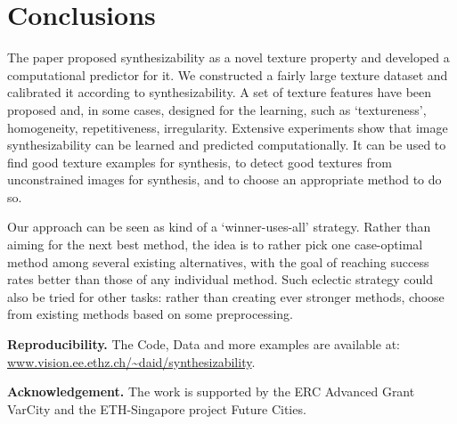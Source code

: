\documentclass[10pt,twocolumn,letterpaper]{article}
\begin{document}
\section{Conclusions}
\label{sec:conclusion}
The paper proposed synthesizability as a novel texture property and
developed a computational predictor for it. We constructed a fairly
large texture dataset and calibrated it according to
synthesizability. A set of texture features have been proposed and, in
some cases, designed for the learning, such as `textureness',
homogeneity, repetitiveness, irregularity. Extensive experiments show
that image synthesizability can be learned and predicted
computationally. It can be used to find good texture examples for
synthesis, to detect good textures from unconstrained images for
synthesis, and to choose an appropriate method to do so.

Our approach can be seen as kind of a `winner-uses-all' strategy. 
Rather than aiming for the next best method, the idea is to rather 
pick one case-optimal method among several existing alternatives,
with the goal of reaching success rates better than those of any 
individual method. Such eclectic strategy could also be tried for 
other tasks: rather than creating ever stronger methods, choose 
from existing methods based on some preprocessing. 

\noindent
\textbf{Reproducibility.} The Code, Data and more examples are
available at: \url{www.vision.ee.ethz.ch/~daid/synthesizability}.

\vspace{1mm}
\noindent
\textbf{Acknowledgement.} The work is supported by the ERC Advanced Grant VarCity and 
the ETH-Singapore project Future Cities.

{\footnotesize


}
\end{document}
